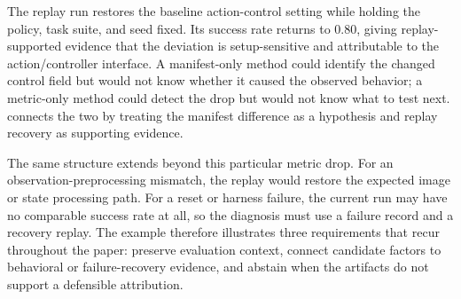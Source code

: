 The replay run restores the baseline action-control setting while holding the policy, task suite, and seed fixed. Its success rate returns to 0.80, giving replay-supported evidence that the deviation is setup-sensitive and attributable to the action/controller interface. A manifest-only method could identify the changed control field but would not know whether it caused the observed behavior; a metric-only method could detect the drop but would not know what to test next. \sys connects the two by treating the manifest difference as a hypothesis and replay recovery as supporting evidence.

The same structure extends beyond this particular metric drop. For an observation-preprocessing mismatch, the replay would restore the expected image or state processing path. For a reset or harness failure, the current run may have no comparable success rate at all, so the diagnosis must use a failure record and a recovery replay. The example therefore illustrates three requirements that recur throughout the paper: preserve evaluation context, connect candidate factors to behavioral or failure-recovery evidence, and abstain when the artifacts do not support a defensible attribution.
